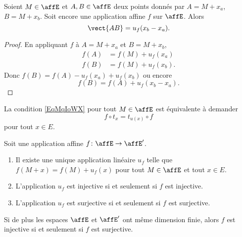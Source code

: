 \begin{lemma}       \label{LEMooXXTPooKYFGGM}
	Soient \( M\in \affE\) et \( A,B\in \affE\) deux points donnés par \( A=M+x_a\), \( B=M+x_b\). Soit encore une application affine \( f\) sur \( \affE\). Alors
	\begin{equation}
		\vect{ AB }=u_f(x_b-x_a).
	\end{equation}
\end{lemma}

\begin{proof}
	En appliquant \( f\) à \( A=M+x_a\) et \( B=M+x_b\),
	\begin{subequations}
		\begin{align}
			f(A) & =f(M)+u_f(x_a)  \\
			f(B) & =f(M)+u_f(x_b).
		\end{align}
	\end{subequations}
	Donc \( f(B)=f(A)-u_f(x_a)+u_f(x_b)\) ou encore
	\begin{equation}
		f(B)=f(A)+u_f(x_b-x_a).
	\end{equation}
\end{proof}

\begin{remark}
	La condition \eqref{EqMqIoWX} pour tout \( M\in\affE\) est équivalente à demander
	\begin{equation}
		f\circ t_x=t_{u(x)}\circ f
	\end{equation}
	pour tout \( x\in E\).
\end{remark}

\begin{proposition}     \label{PROPooALXYooHoMdqQ}
	Soit une application affine \( f\colon \affE\to \affE'\).
	\begin{enumerate}
		\item       \label{ITEMooSKCYooHyRZYN}
		      Il existe une unique application linéaire \( u_f\) telle que \( f(M+x)=f(M)+u_f(x)\) pour tout \( M\in \affE\) et tout \( x\in E\).
		\item
		      L'application \( u_f\) est injective si et seulement si \( f\) est injective.
		\item
		      L'application \( u_f\) est surjective si et seulement si \( f\) est surjective.
	\end{enumerate}
	Si de plus les espaces \( \affE\) et \( \affE'\) ont même dimension finie, alors \( f\) est injective si et seulement si \( f\) est surjective.
\end{proposition}

